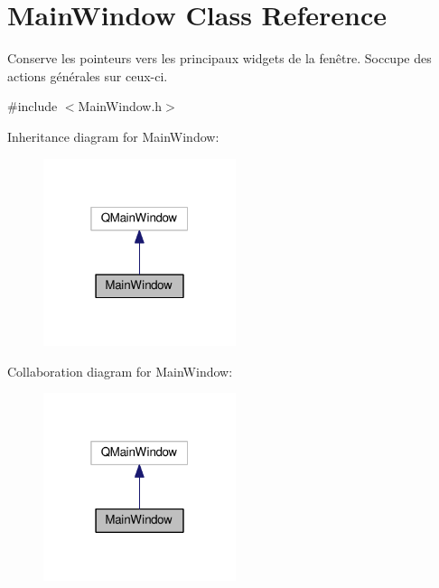 \hypertarget{class_main_window}{}\section{Main\+Window Class Reference}
\label{class_main_window}


Conserve les pointeurs vers les principaux widgets de la fenêtre. S\textquotesingle{}occupe des actions générales sur ceux-\/ci.  




{\ttfamily \#include $<$Main\+Window.\+h$>$}



Inheritance diagram for Main\+Window\+:\nopagebreak
\begin{figure}[H]
\begin{center}
\leavevmode
\includegraphics[width=160pt]{class_main_window__inherit__graph}
\end{center}
\end{figure}


Collaboration diagram for Main\+Window\+:\nopagebreak
\begin{figure}[H]
\begin{center}
\leavevmode
\includegraphics[width=160pt]{class_main_window__coll__graph}
\end{center}
\end{figure}
